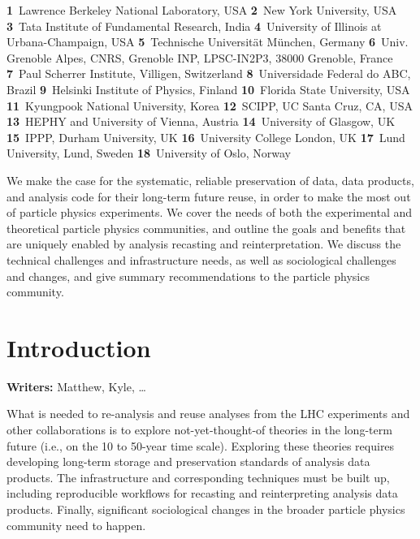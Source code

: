 \documentclass[11pt]{article}
\begin{document}
\begin{center}
\textbf{1}~Lawrence Berkeley National Laboratory, USA
\textbf{2}~New York University, USA
\textbf{3}~Tata Institute of Fundamental Research, India
\textbf{4}~University of Illinois at Urbana-Champaign, USA
\textbf{5}~Technische Universität München, Germany
\textbf{6}~Univ. Grenoble Alpes, CNRS, Grenoble INP, LPSC-IN2P3, 38000 Grenoble, France
\textbf{7}~Paul Scherrer Institute, Villigen, Switzerland
\textbf{8}~Universidade Federal do ABC, Brazil
\textbf{9}~Helsinki Institute of Physics, Finland
\textbf{10}~Florida State University, USA
\textbf{11}~Kyungpook National University, Korea
\textbf{12}~SCIPP, UC Santa Cruz, CA, USA
\textbf{13}~HEPHY and University of Vienna, Austria
\textbf{14}~University of Glasgow, UK
\textbf{15}~IPPP, Durham University, UK
\textbf{16}~University College London, UK
\textbf{17}~Lund University, Lund, Sweden
\textbf{18}~University of Oslo, Norway
\end{center}

\begin{Abstract}
\noindent We make the case for the systematic, reliable preservation of data, data products, and analysis code for their long-term future reuse, in order to make the most out of particle physics experiments.
We cover the needs of both the experimental and theoretical particle physics communities, and outline the goals and benefits that are uniquely enabled by analysis recasting and reinterpretation. 
We discuss the technical challenges and infrastructure needs, as well as sociological challenges and changes, and give summary recommendations to the particle physics community.
\end{Abstract}

\clearpage

\tableofcontents

\section{Introduction}

\noindent\textbf{Writers:} Matthew, Kyle, \ldots

What is needed to re-analysis and reuse analyses from the LHC experiments and other collaborations is to explore not-yet-thought-of theories in the long-term future (i.e., on the 10 to 50-year time scale).
Exploring these theories requires developing long-term storage and preservation standards of analysis data products. The infrastructure and corresponding techniques must be built up, including reproducible workflows for recasting and reinterpreting analysis data products. Finally, significant sociological changes in the broader particle physics community need to happen.
\end{document}
